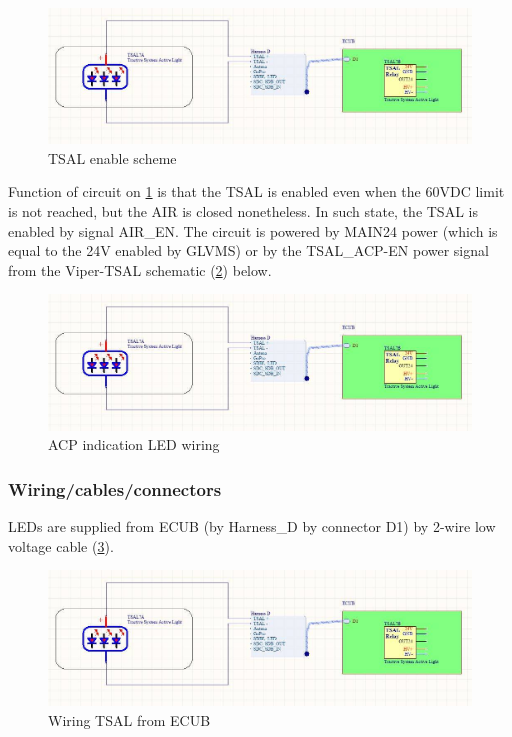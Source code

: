 \begin{figure}[H]
	\centering
	\includegraphics[width=\textwidth]{./img/tsal-wiring.jpg}
	\caption{TSAL enable scheme}
	\label{fig:TSAL-enable}
\end{figure}

Function of circuit on \ref{fig:TSAL-enable} is that the TSAL is enabled even when the 60VDC limit is not reached, but the AIR is closed nonetheless. In such state, the TSAL is enabled by signal AIR\_EN. The circuit is powered by MAIN24 power (which is equal to the 24V enabled by GLVMS) or by the TSAL\_ACP-EN power signal from the Viper-TSAL schematic (\ref{fig:TSAL-ACPindicator}) below.

\begin{figure}[H]
	\centering
	\includegraphics[width=\textwidth]{./img/tsal-wiring.jpg}
	\caption{ACP indication LED wiring}
	\label{fig:TSAL-ACPindicator}
\end{figure}

\subsubsection{Wiring/cables/connectors}

LEDs are supplied from ECUB (by Harness\_D by connector D1) by 2-wire low voltage cable (\ref{fig:TSAL-wiring}).

\begin{figure}[H]
	\centering
	\includegraphics[width=\textwidth,]{./img/tsal-wiring.jpg}
	\caption{Wiring TSAL from ECUB}
	\label{fig:TSAL-wiring}
\end{figure}

